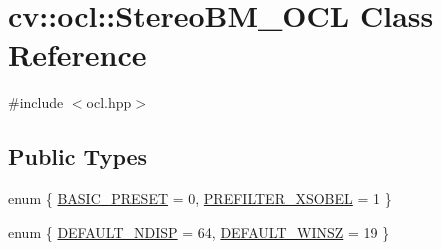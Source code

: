 \hypertarget{classcv_1_1ocl_1_1StereoBM__OCL}{\section{cv\-:\-:ocl\-:\-:Stereo\-B\-M\-\_\-\-O\-C\-L Class Reference}
\label{classcv_1_1ocl_1_1StereoBM__OCL}
}


{\ttfamily \#include $<$ocl.\-hpp$>$}

\subsection*{Public Types}
\begin{DoxyCompactItemize}
\item 
enum \{ \hyperlink{classcv_1_1ocl_1_1StereoBM__OCL_aa2519d0667d1e18f5bd5a0b30d038143a0b60ed583f168ea171cb60a41bc5b9d1}{B\-A\-S\-I\-C\-\_\-\-P\-R\-E\-S\-E\-T} = 0, 
\hyperlink{classcv_1_1ocl_1_1StereoBM__OCL_aa2519d0667d1e18f5bd5a0b30d038143ab33cc35b63f78df3abe88010628c53aa}{P\-R\-E\-F\-I\-L\-T\-E\-R\-\_\-\-X\-S\-O\-B\-E\-L} = 1
 \}
\item 
enum \{ \hyperlink{classcv_1_1ocl_1_1StereoBM__OCL_abe855c11c6bac7c5e3fa664261c415aba2dab5b11e06fea1dfb21c9f0fe20d775}{D\-E\-F\-A\-U\-L\-T\-\_\-\-N\-D\-I\-S\-P} = 64, 
\hyperlink{classcv_1_1ocl_1_1StereoBM__OCL_abe855c11c6bac7c5e3fa664261c415aba83dcbfb5f4b5682a59050ee1bf2d144a}{D\-E\-F\-A\-U\-L\-T\-\_\-\-W\-I\-N\-S\-Z} = 19
 \}
\end{DoxyCompactItemize}
